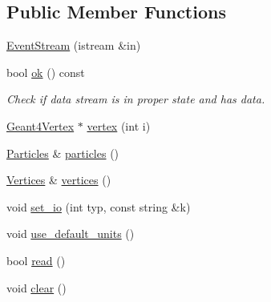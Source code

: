 \subsection*{Public Member Functions}
\begin{DoxyCompactItemize}
\item 
\hyperlink{class_d_d4hep_1_1_simulation_1_1_hep_m_c_1_1_event_stream_a73b3cc7b9dee4ad7e9e2dcf17a09e896}{Event\+Stream} (istream \&in)
\item 
bool \hyperlink{class_d_d4hep_1_1_simulation_1_1_hep_m_c_1_1_event_stream_aa3685ed6ee496868702008d626529e9a}{ok} () const
\begin{DoxyCompactList}\small\item\em Check if data stream is in proper state and has data. \end{DoxyCompactList}\item 
\hyperlink{class_d_d4hep_1_1_simulation_1_1_geant4_vertex}{Geant4\+Vertex} $\ast$ \hyperlink{class_d_d4hep_1_1_simulation_1_1_hep_m_c_1_1_event_stream_ac4d60be95873b8933646c17f4a306058}{vertex} (int i)
\item 
\hyperlink{class_d_d4hep_1_1_simulation_1_1_hep_m_c_1_1_event_stream_a99e0260f816229d8ab3ebdd5487b3af1}{Particles} \& \hyperlink{class_d_d4hep_1_1_simulation_1_1_hep_m_c_1_1_event_stream_a5a35867853fd21f0c0cf2754bd568671}{particles} ()
\item 
\hyperlink{class_d_d4hep_1_1_simulation_1_1_hep_m_c_1_1_event_stream_a3e270d38edde8369e52ad396615a2755}{Vertices} \& \hyperlink{class_d_d4hep_1_1_simulation_1_1_hep_m_c_1_1_event_stream_acc8b24a014d6af70e07a6396375692e9}{vertices} ()
\item 
void \hyperlink{class_d_d4hep_1_1_simulation_1_1_hep_m_c_1_1_event_stream_a8c27011e1d7e6ae4b72e763d9253824d}{set\+\_\+io} (int typ, const string \&k)
\item 
void \hyperlink{class_d_d4hep_1_1_simulation_1_1_hep_m_c_1_1_event_stream_acd5b712fdee97581ee70ce3365b11270}{use\+\_\+default\+\_\+units} ()
\item 
bool \hyperlink{class_d_d4hep_1_1_simulation_1_1_hep_m_c_1_1_event_stream_a0a565ef129dd64aae36e05efc29a4be4}{read} ()
\item 
void \hyperlink{class_d_d4hep_1_1_simulation_1_1_hep_m_c_1_1_event_stream_a154b4f2355eac25743ec73982d588c39}{clear} ()
\end{DoxyCompactItemize}
